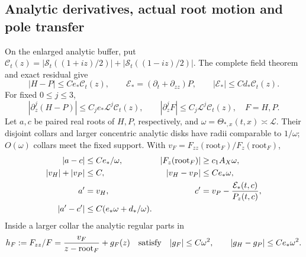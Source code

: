 \subsection{Analytic derivatives, actual root motion and pole transfer}
\begin{lemma}
\label{lem:positive-evolution-jets}
On the enlarged analytic buffer, put
$\mathcal C_t(z)=|\mathcal S_t((1+iz)/2)|+
|\mathcal S_t((1-iz)/2)|$. The complete field theorem and exact
residual give
\begin{equation}
 |H-P|\le Ce_*\mathcal C_t(z),\qquad
 \mathcal E_*=(\partial_t+\partial_{zz})P,
 \qquad |\mathcal E_*|\le Cd_*\mathcal C_t(z).
 \label{eq:positive-field-input}
\end{equation}
For fixed $0\le j\le3$,
\begin{equation}
 |\partial_z^j(H-P)|\le C_j e_*\mathcal L^j\mathcal C_t(z),
 \qquad |\partial_z^jF|\le C_j\mathcal L^j\mathcal C_t(z),
 \quad F=H,P.
 \label{eq:positive-Cauchy-jets}
\end{equation}
Let $a,c$ be paired real roots of $H,P$, respectively, and
$\omega=\Theta_{*,x}(t,x)\asymp\mathcal L$. Their disjoint collars
and larger concentric analytic disks have radii comparable to
$1/\omega$; $O(\omega)$ collars meet the fixed support. With
$v_F=F_{zz}(\text{root}_F)/F_z(\text{root}_F)$,
\begin{align}
 |a-c|&\le Ce_*/\omega,&
 |F_z(\text{root}_F)|&\ge c_1A_X\omega,\notag\\
 |v_H|+|v_P|&\le C,& |v_H-v_P|&\le Ce_*\omega,\notag\\
 a'&=v_H,&c'&=v_P-\frac{\mathcal E_*(t,c)}{P_z(t,c)},\notag\\
 |a'-c'|&\le C(e_*\omega+d_*/\omega).
 \label{eq:positive-root-motion}
\end{align}
Inside a larger collar the analytic regular parts in
\begin{equation}
 h_F:=F_{zz}/F=
   \frac{v_F}{z-\text{root}_F}+g_F(z)
 \quad\hbox{satisfy}\quad
 |g_F|\le C\omega^2,\qquad |g_H-g_P|\le Ce_*\omega^2.
 \label{eq:positive-pole-parts}
\end{equation}
\end{lemma}
